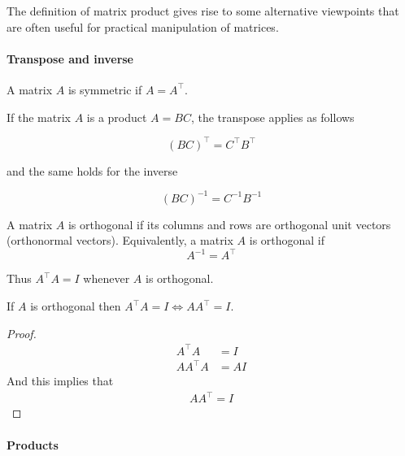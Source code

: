 
The definition of matrix product gives rise to some alternative viewpoints that are often useful for practical manipulation of matrices.

\paragraph{Transpose and inverse}

\begin{defn}
	A matrix $A$ is symmetric if $A = A^\top$.
\end{defn}

If the matrix $A$ is a product $A = BC$, the transpose applies as follows

\begin{equation}
	(BC)^\top = C^\top B^\top
\end{equation}

and the same holds for the inverse

\begin{equation}
	(BC)^{-1} = C^{-1} B^{-1}
\end{equation}

\begin{defn}
	A matrix $A$ is orthogonal if its columns and rows are orthogonal unit vectors (orthonormal vectors). Equivalently, a matrix $A$ is orthogonal if
	\begin{equation}
		A^{-1} = A^\top
	\end{equation}
\end{defn}
Thus $A^\top A = I$ whenever $A$ is orthogonal.

\begin{claim}\label{cl:orthogonal}
	If $A$ is orthogonal then $A^\top A = I \iff A A^\top = I$.
\end{claim}

\begin{proof}
	\begin{align}
		A^\top A &= I \tag{by multiplying both sides for $A$} \\ 
		A A^\top A &= A I 
	\end{align}
	And this implies that 
	\begin{align}
		A A^\top = I
	\end{align}
\end{proof}

\paragraph{Products}

